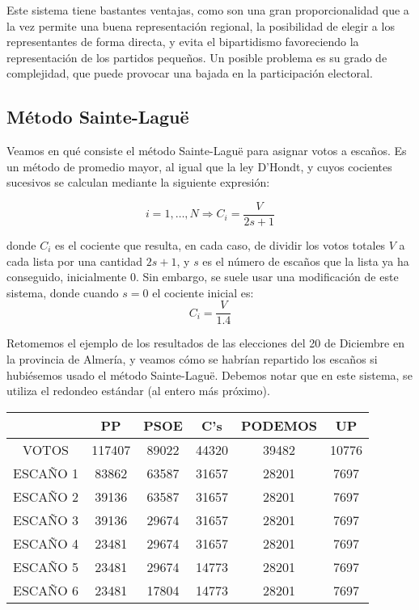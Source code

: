 \documentclass[11pt]{article}
\newcommand\console[1]{{\inconsolata #1}}
\begin{document}
Este sistema tiene bastantes ventajas, como son una gran proporcionalidad que a la vez permite una buena representación regional, la posibilidad de elegir a los representantes de forma directa, y evita el bipartidismo favoreciendo la representación de los partidos pequeños. Un posible problema es su grado de complejidad, que puede provocar una bajada en la participación electoral.

\subsection{Método Sainte-Laguë}

Veamos en qué consiste el método Sainte-Laguë para asignar votos a escaños. Es un método de promedio mayor, al igual que la ley D'Hondt, y cuyos cocientes sucesivos se calculan mediante la siguiente expresión:

$$ i = 1,\ldots,N \Rightarrow C_i = \dfrac{V}{2s + 1}$$
	
	donde $C_i$ es el cociente que resulta, en cada caso, de dividir los votos totales $V$ a cada lista por una cantidad $2s + 1$, y $s$ es el número de escaños que la lista ya ha conseguido, inicialmente 0. Sin embargo, se suele usar una modificación de este sistema, donde cuando $s=0$ el cociente inicial es: $$ C_i = \frac{V}{1.4} $$

Retomemos el ejemplo de los resultados de las elecciones del 20 de Diciembre en la provincia de Almería, y veamos cómo se habrían repartido los escaños si hubiésemos usado el método Sainte-Laguë. Debemos notar que en este sistema, se utiliza el redondeo estándar (al entero más próximo).\\
\console{
\begin{center}
\begin{tabular}{|c|c|c|c|c|c|}
	\hline
	 & PP & PSOE & C's & PODEMOS & UP \\
	\hline
	VOTOS & 117407 & 89022 & 44320 & 39482 & 10776 \\
	\hline
	ESCAÑO 1 &\cellcolor{gray!25} 83862 & 63587 & 31657 & 28201 & 7697 \\
	\hline
	ESCAÑO 2 & 39136 &\cellcolor{gray!25} 63587 & 31657 & 28201 & 7697 \\
	\hline
	ESCAÑO 3 &\cellcolor{gray!25} 39136 & 29674 & 31657 & 28201 & 7697 \\
	\hline
	ESCAÑO 4 & 23481 & 29674 &\cellcolor{gray!25} 31657 & 28201 & 7697 \\
	\hline
	ESCAÑO 5 & 23481 &\cellcolor{gray!25} 29674 & 14773 & 28201 & 7697 \\
	\hline
	ESCAÑO 6 & 23481 & 17804 & 14773 &\cellcolor{gray!25} 28201 & 7697 \\
	\hline 
\end{tabular}
\end{center}
}
\end{document}
